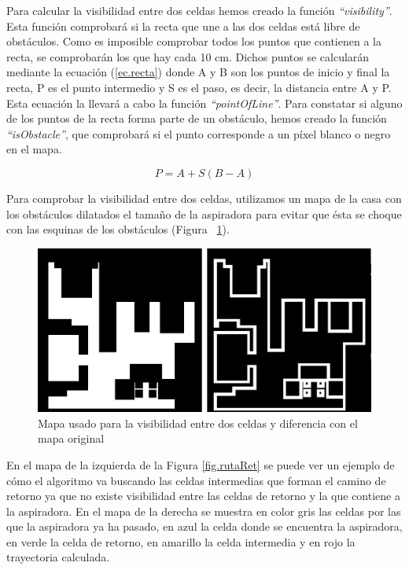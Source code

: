 Para calcular la visibilidad entre dos celdas hemos creado la función \textit{``visibility''}. Esta función comprobará si la recta que une a las dos celdas está libre de obstáculos. Como es imposible comprobar todos los puntos que contienen a la recta, se comprobarán los que hay cada 10 cm. Dichos puntos se calcularán mediante la ecuación (\ref{ec.recta}) donde A y B son los puntos de inicio y final la recta, P es el punto intermedio y S es el paso, es decir, la distancia entre A y P. Esta ecuación la llevará a cabo la función \textit{``pointOfLine''}. Para constatar si alguno de los puntos de la recta forma parte de un obstáculo, hemos creado la función \textit{``isObstacle''}, que comprobará si el punto corresponde a un píxel blanco o negro en el mapa.


\begin{equation}
\label{ec.recta}
P = A + S(B - A)
\end{equation}


Para comprobar la visibilidad entre dos celdas, utilizamos un mapa de la casa con los obstáculos dilatados el tamaño de la aspiradora para evitar que ésta se choque con las esquinas de los obstáculos (Figura ~\ref{fig.mapaVis}).

\begin{figure}[H]
  \begin{center}
    \includegraphics[width=1.0\textwidth]{figures/Vacuum/2mapasVis.jpg}
		\caption{Mapa usado para la visibilidad entre dos celdas y diferencia con el mapa original}
		\label{fig.mapaVis}
		\end{center}
\end{figure}


En el mapa de la izquierda de la Figura \ref{fig.rutaRet} se puede ver un ejemplo de cómo el algoritmo va buscando las celdas intermedias que forman el camino de retorno ya que no existe visibilidad entre las celdas de retorno y la que contiene a la aspiradora. En el mapa de la derecha se muestra en color gris las celdas por las que la aspiradora ya ha pasado, en azul la celda donde se encuentra la aspiradora, en verde la celda de retorno, en amarillo la celda intermedia y en rojo la trayectoria calculada.\\

